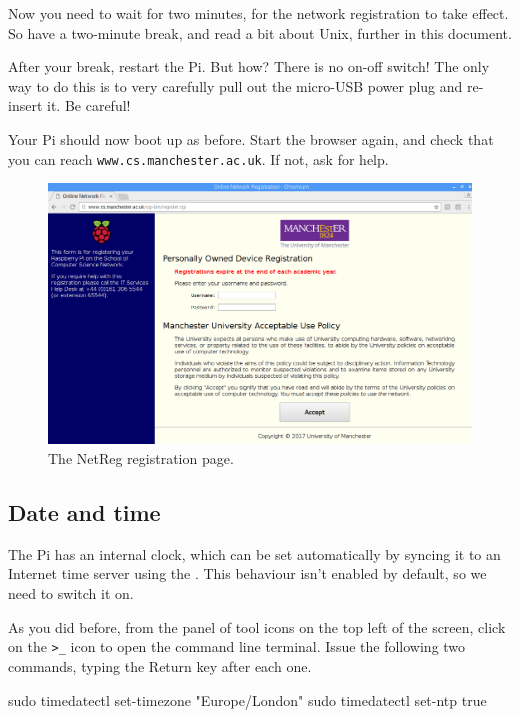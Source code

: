 Now you need to wait for two minutes, for the network registration to
take effect. So have a two-minute break, and read a bit about Unix, further in this document.

After your break, restart the Pi. But how? There is no on-off switch!
The only way to do this is to very carefully pull out the micro-USB
power plug and re-insert it. Be careful!

Your Pi should now boot up as before. Start the browser again, and
check that you can reach \verb+www.cs.manchester.ac.uk+. If not, ask for help.

\begin{figure}
\centerline{\includegraphics[width=13cm]{images/NetReg.png}}
\caption{The NetReg registration page.} \label{figure:netreg}
\end{figure}

\subsection{Date and time}
\label{sec:update1}

The Pi has an internal clock, which can be set automatically by
syncing it to an Internet time server using the
. This
behaviour isn't enabled by default, so we need to switch it on.

\cbstart 
As you did before, from the panel of tool icons on the top left of the
screen, click on the \verb+>_+ icon to open the
command line terminal. Issue the following two commands, typing the
Return key after each one.
\cbend 

\begin{ttoutenv}
sudo timedatectl set-timezone "Europe/London"
sudo timedatectl set-ntp true
\end{ttoutenv}

